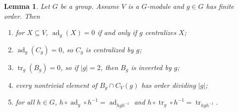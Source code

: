 \documentclass[a4paper, 11pt]{amsart}
\theoremstyle{plain}
\newtheorem{lemma}[theorem]{Lemma}
\theoremstyle{definition}
\theoremstyle{remark}
\DeclareMathOperator{\ad}{ad}
\DeclareMathOperator{\tr}{tr}
\begin{document}
\begin{lemma}\label{l.AdjointTrace}
Let $G$ be a group. Assume $V$ is a $G$-module and $g\in G$ has finite order. Then
\begin{enumerate}
    \item\label{l.AdjointTrace.i:BTrivial} for $X\subseteq V$, $\ad_g(X) = 0$ if and only if $g$ centralizes $X$;
    \item\label{l.AdjointTrace.i:CCentral} $\ad_g(C_g) = 0$, so $C_g$ is centralized by $g$;
    \item\label{l.AdjointTrace.i:traceonB} $\tr_g(B_g) = 0$, so if $|g| = 2$, then $B_g$ is inverted by $g$;
    \item\label{l.AdjointTrace.i:BCIntersection} every nontrivial element of $B_g \cap C_V(g)$ has order dividing $|g|$;
    \item\label{l.AdjointTrace.i:AdTrConjugation} for all $h\in G$, $h\circ \ad_g\circ h^{-1} = \ad_{hgh^{-1}}$ and $h\circ \tr_g\circ h^{-1} = \tr_{hgh^{-1}}$. 
\end{enumerate}
\end{lemma}
\end{document}
